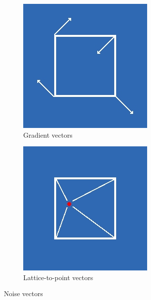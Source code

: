 		\begin{figure}[h]
			\begin{subfigure}{0.5\textwidth}
				\centering
				\includegraphics[width=0.5\linewidth]{"Images/gradient_vectors"}
				\caption{Gradient vectors}
				\label{fig:gradient_vectors}
			\end{subfigure}
			\begin{subfigure}{0.5\textwidth}
				\centering
				\includegraphics[width=0.5\linewidth]{"Images/vectors"}
				\caption{Lattice-to-point vectors}
				\label{fig:lattice-vectors}
			\end{subfigure}
			\caption{Noise vectors}
			\label{fig:noise_vectors}
		\end{figure}
		
